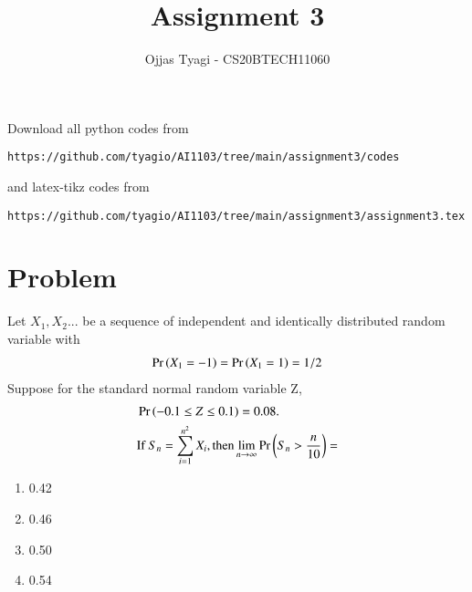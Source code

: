 \documentclass[journal,12pt,twocolumn]{IEEEtran}
\begin{document}
\providecommand{\fourier}{\overset{\mathcal{F}}{ \rightleftharpoons}}
\providecommand{\system}{\overset{\mathcal{H}}{ \longleftrightarrow}}
\newcommand{\solution}{\noindent \textbf{Solution: }}
\newcommand{\cosec}{\,\text{cosec}\,}
\providecommand{\dec}[2]{\ensuremath{\overset{#1}{\underset{#2}{\gtrless}}}}
\newcommand{\myvec}[1]{\ensuremath{\begin{pmatrix}#1\end{pmatrix}}}
\newcommand{\mydet}[1]{\ensuremath{\begin{vmatrix}#1\end{vmatrix}}}
\makeatletter
{}
\makeatother
\let\StandardTheFigure\thefigure
\let\vec\mathbf
\renewcommand{\thefigure}{\theproblem}
\def\putbox#1#2#3{\makebox[0in][l]{\makebox[#1][l]{}\raisebox{\baselineskip}[0in][0in]{\raisebox{#2}[0in][0in]{#3}}}}
     \def\rightbox#1{\makebox[0in][r]{#1}}
     \def\centbox#1{\makebox[0in]{#1}}
     \def\topbox#1{\raisebox{-\baselineskip}[0in][0in]{#1}}
     \def\midbox#1{\raisebox{-0.5\baselineskip}[0in][0in]{#1}}
\vspace{3cm}
\title{Assignment 3}
\author{Ojjas Tyagi - CS20BTECH11060}
\maketitle
\newpage
\bigskip
\renewcommand{\thefigure}{\theenumi}
\renewcommand{\thetable}{\theenumi}
Download all python codes from 
\begin{lstlisting}
https://github.com/tyagio/AI1103/tree/main/assignment3/codes
\end{lstlisting}
%
and latex-tikz codes from 
%
\begin{lstlisting}
https://github.com/tyagio/AI1103/tree/main/assignment3/assignment3.tex
\end{lstlisting}
\section{Problem}
Let \(X_1,X_2\)... be a sequence of independent and identically distributed random variable with
\begin{align}
    \Pr\left(X_1=-1\right)=\Pr\left(X_1=1\right)=1/2
\end{align}
Suppose for the standard normal random variable Z,
\begin{align}
&\Pr\left(-0.1\leq Z \leq 0.1\right)=0.08 .\label{qneq} \\ \nonumber
&\text{If } S_n= \sum_{i=1}^{n^2} X_i ,\text{then} \lim_{n\to\infty} \Pr\left(S_n >\frac{n}{10}\right) =
\end{align}
\begin{enumerate}
    \item 0.42
    \item 0.46
    \item 0.50
    \item 0.54
\end{enumerate}
\end{document}
